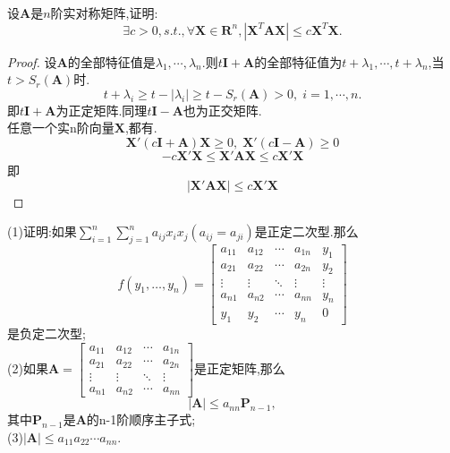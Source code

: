 \documentclass[lang=cn,11pt,normal]{elegantbook}
\begin{document}
	\begin{exercise}
		设$\boldsymbol{A}$是$n$阶实对称矩阵,证明:
		$$
		\exists c>0,s.t., \forall \boldsymbol{X}\in \boldsymbol{R}^n,|\boldsymbol{X}^T\boldsymbol{A}\boldsymbol{X}|\leq c\boldsymbol{X}^T\boldsymbol{X}.
		$$
	\end{exercise}
	\begin{proof}
		设$\boldsymbol{A}$的全部特征值是$\lambda_1,\cdots,\lambda_n$.则$t\boldsymbol{I}+\boldsymbol{A}$的全部特征值为$t+\lambda_1,\cdots,t+\lambda_n$,当$t>S_r(\boldsymbol{A})$时.
		$$
		t+\lambda_i\geq t-|\lambda_i|\geq t-S_r(\boldsymbol{A})>0,\;i=1,\cdots,n.
		$$
		即$t\boldsymbol{I}+\boldsymbol{A}$为正定矩阵.同理$t\boldsymbol{I}-\boldsymbol{A}$也为正交矩阵.\\
		任意一个实n阶向量$\boldsymbol{X}$,都有.
		$$
		\boldsymbol{X}'(c\boldsymbol{I}+\boldsymbol{A})\boldsymbol{X}\geqslant 0,\;\boldsymbol{X}'(c\boldsymbol{I}-\boldsymbol{A})\geqslant 0
		$$
		$$
		-c\boldsymbol{X}'\boldsymbol{X}\leqslant \boldsymbol{X}'\boldsymbol{AX}\leqslant c\boldsymbol{X}'\boldsymbol{X}
		$$
		即$$|\boldsymbol{X}'\boldsymbol{AX}|\leqslant c\boldsymbol{X}'\boldsymbol{X}$$
	\end{proof}
	\begin{exercise}
		(1)证明:如果$\sum^n_{i=1}\sum^n_{j=1}a_{ij}x_ix_j(a_{ij}=a_{ji})$是正定二次型.那么
		$$
		f(y_1,\dots,y_n)=
		\begin{bmatrix}
		a_{11}&a_{12}&\cdots&a_{1n}&y_1\\
		a_{21}&a_{22}&\cdots&a_{2n}&y_2\\
		\vdots&\vdots&\ddots&\vdots&\vdots\\
		a_{n1}&a_{n2}&\cdots&a_{nn}&y_n\\
		y_1&y_2&\cdots&y_n&0
		\end{bmatrix}
		$$
		是负定二次型;\\
		(2)如果$\boldsymbol{A}=
		\begin{bmatrix}
		a_{11}&a_{12}&\cdots&a_{1n}\\
		a_{21}&a_{22}&\cdots&a_{2n}\\
		\vdots&\vdots&\ddots&\vdots\\
		a_{n1}&a_{n2}&\cdots&a_{nn}
		\end{bmatrix}
		$是正定矩阵,那么
		$$
		|\boldsymbol{A}|\leq a_{nn}\boldsymbol{P}_{n-1},
		$$
		其中$\boldsymbol{P}_{n-1}$是$\boldsymbol{A}$的n-1阶顺序主子式;\\
		(3)$|\boldsymbol{A}|\leq a_{11}a_{22}\cdots a_{nn}.$
	\end{exercise}
\end{document}
